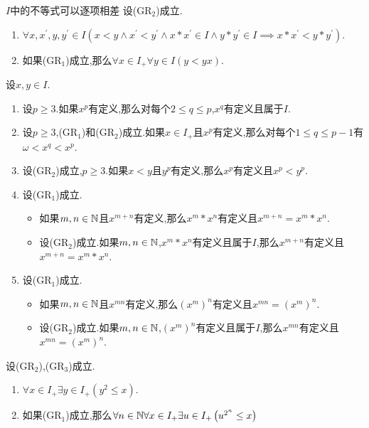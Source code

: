 \begin{proposition}{$I$中的不等式可以逐项相差}{}
	设($\mathrm{GR}_{2}$)成立.
	\begin{enumerate}
		\item $\forall x,x^{\prime},y,y^{\prime}\in I\left(x<y\wedge x^{\prime}<y^{\prime}\wedge x\ast x^{\prime}\in I\wedge y\ast y^{\prime}\in I\implies x\ast x^{\prime}<y\ast y^{\prime}\right)$.
		\item 如果($\mathrm{GR}_{1}$)成立,那么$\forall x\in I_{+}\forall y\in I\left(y<yx\right)$.
	\end{enumerate}
\end{proposition}

\begin{proposition}{}{}
	设$x,y\in I$.
	\begin{enumerate}
		\item 设$p\geq 3$.如果$x^{p}$有定义,那么对每个$2\leq q\leq p$,$x^{q}$有定义且属于$I$.
		\item 设$p\geq 3$,($\mathrm{GR}_{1}$)和($\mathrm{GR}_{2}$)成立.如果$x\in I_{+}$且$x^{p}$有定义,那么对每个$1\leq q\leq p-1$有$\omega<x^{q}<x^{p}$.
		\item 设($\mathrm{GR}_{2}$)成立,$p\geq 3$.如果$x<y$且$y^{p}$有定义,那么$x^{p}$有定义且$x^{p}<y^{p}$.
		\item 设($\mathrm{GR}_{1}$)成立.
		\begin{itemize}
			\item 如果$m,n\in\mathbb{N}$且$x^{m+n}$有定义,那么$x^{m}\ast x^{n}$有定义且$x^{m+n}=x^{m}\ast x^{n}$.
			\item 设($\mathrm{GR}_{2}$)成立.如果$m,n\in\mathbb{N}$,$x^{m}\ast x^{n}$有定义且属于$I$,那么$x^{m+n}$有定义且$x^{m+n}=x^{m}\ast x^{n}$.
		\end{itemize}
		\item 设($\mathrm{GR}_{1}$)成立.
		\begin{itemize}
			\item 如果$m,n\in\mathbb{N}$且$x^{mn}$有定义,那么$\left(x^{m}\right)^{n}$有定义且$x^{mn}=\left(x^{m}\right)^{n}$.
			\item 设($\mathrm{GR}_{2}$)成立.如果$m,n\in\mathbb{N}$,$\left(x^{m}\right)^{n}$有定义且属于$I$,那么$x^{mn}$有定义且$x^{mn}=\left(x^{m}\right)^{n}$.
		\end{itemize}
	\end{enumerate}
\end{proposition}

\begin{proposition}{}{}
	设($\mathrm{GR}_{2}$),($\mathrm{GR}_{3}$)成立.
	\begin{enumerate}
		\item $\forall x\in I_{+}\exists y\in I_{+}\left(y^{2}\leq x\right)$.
		\item 如果($\mathrm{GR}_{1}$)成立,那么$\forall n\in\mathbb{N}\forall x\in I_{+}\exists u\in I_{+}\left(u^{2^{n}}\leq x\right)$
	\end{enumerate}
\end{proposition}

